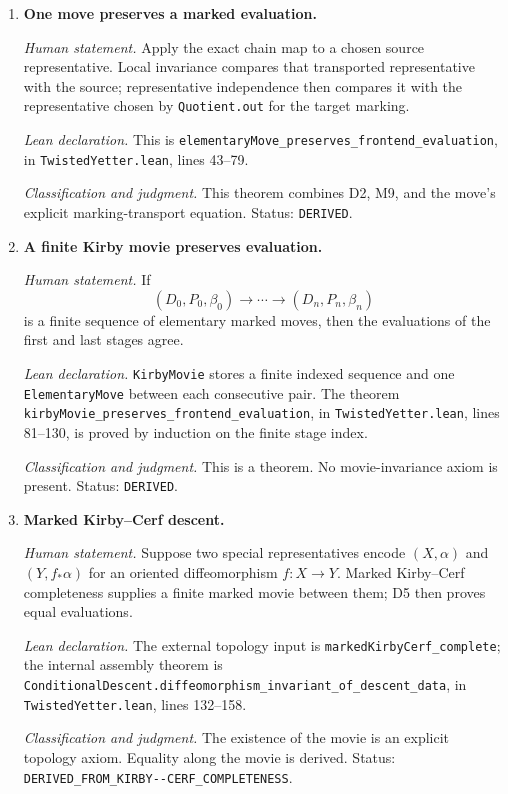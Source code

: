 \begin{enumerate}[label=\textbf{D\arabic*.},leftmargin=*]
\emph{Classification and judgment.}
This is a noncomputable definition plus a separate theorem; choice
independence is not hidden in the definition.  Status: \texttt{MATCH}.

\item \textbf{One move preserves a marked evaluation.}

\emph{Human statement.}
Apply the exact chain map to a chosen source representative.  Local invariance
compares that transported representative with the source; representative
independence then compares it with the representative chosen by
\texttt{Quotient.out} for the target marking.

\emph{Lean declaration.}
This is \nolinkurl{elementaryMove_preserves_frontend_evaluation}, in
\nolinkurl{TwistedYetter.lean}, lines 43--79.

\emph{Classification and judgment.}
This theorem combines D2, M9, and the move's explicit marking-transport
equation.  Status: \texttt{DERIVED}.

\item \textbf{A finite Kirby movie preserves evaluation.}

\emph{Human statement.}
If
\[
 (D_0,P_0,\beta_0)\longrightarrow\cdots\longrightarrow
 (D_n,P_n,\beta_n)
\]
is a finite sequence of elementary marked moves, then the evaluations of the
first and last stages agree.

\emph{Lean declaration.}
\texttt{KirbyMovie} stores a finite indexed sequence and one
\texttt{ElementaryMove} between each consecutive pair.  The theorem
\nolinkurl{kirbyMovie_preserves_frontend_evaluation}, in
\nolinkurl{TwistedYetter.lean}, lines 81--130, is proved by induction on the
finite stage index.

\emph{Classification and judgment.}
This is a theorem.  No movie-invariance axiom is present.  Status:
\texttt{DERIVED}.

\item \textbf{Marked Kirby--Cerf descent.}

\emph{Human statement.}
Suppose two special representatives encode $(X,\alpha)$ and
$(Y,f_*\alpha)$ for an oriented diffeomorphism $f\colon X\to Y$.  Marked
Kirby--Cerf completeness supplies a finite marked movie between them; D5 then
proves equal evaluations.

\emph{Lean declaration.}
The external topology input is \nolinkurl{markedKirbyCerf_complete}; the
internal assembly theorem is
\nolinkurl{ConditionalDescent.diffeomorphism_invariant_of_descent_data}, in
\nolinkurl{TwistedYetter.lean}, lines 132--158.

\emph{Classification and judgment.}
The existence of the movie is an explicit topology axiom.  Equality along the
movie is derived.  Status: \nolinkurl{DERIVED_FROM_KIRBY--CERF_COMPLETENESS}.

\end{enumerate}

